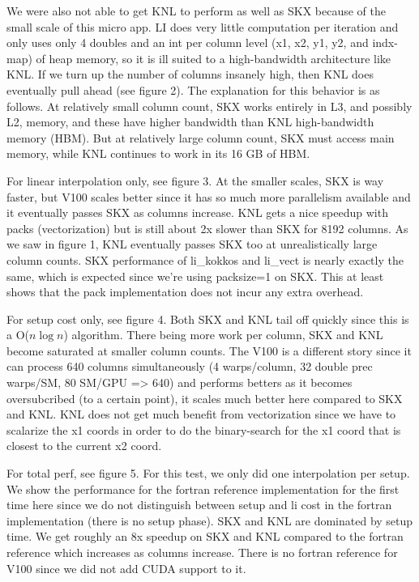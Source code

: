 \documentclass[10pt,twocolumn]{article}
\begin{document}
We were also not able to get KNL to perform as well as SKX because of the small scale
of this micro app. LI does very little computation per iteration and only uses only 4 doubles and an
int per column level (x1, x2, y1, y2, and indx-map) of heap memory, so it is ill suited to a high-bandwidth architecture
like KNL. If we turn up the number of columns insanely high, then KNL does eventually
pull ahead (see figure 2).
The explanation for this behavior is as follows.
At relatively small column count, SKX works entirely in L3, and possibly L2, memory,
and these have higher bandwidth than KNL high-bandwidth memory (HBM).
But at relatively large column count, SKX must access main memory,
while KNL continues to work in its 16 GB of HBM.

For linear interpolation only, see figure 3. At the smaller scales,
SKX is way faster, but V100 scales better since it has so much more
parallelism available and it eventually passes SKX as columns increase. KNL gets a nice speedup with packs
(vectorization) but is still about 2x slower than SKX for 8192
columns. As we saw in figure 1, KNL eventually passes SKX too at unrealistically large
column counts. SKX performance of li\_kokkos and li\_vect is nearly exactly the
same, which is expected since we're using packsize=1 on SKX. This at
least shows that the pack implementation does not incur any extra
overhead.

For setup cost only, see figure 4. Both SKX and KNL tail off quickly
since this is a O($n \log n$) algorithm. There being more work per column,
SKX and KNL become saturated at smaller column counts. The V100 is a different
story since it can process 640 columns simultaneously (4 warps/column, 32 double prec warps/SM, 80 SM/GPU => 640)
and performs betters as it becomes oversubcribed (to a certain point), it
scales much better here compared to SKX and KNL. KNL does not get much benefit from
vectorization since we have to scalarize the x1 coords in order to do
the binary-search for the x1 coord that is closest to the current x2
coord.

For total perf, see figure 5. For this test, we only did one
interpolation per setup. We show the performance for the fortran
reference implementation for the first time here since we do not
distinguish between setup and li cost in the fortran implementation
(there is no setup phase). SKX and KNL are dominated by setup time. We
get roughly an 8x speedup on SKX and KNL compared to the fortran
reference which increases as columns increase. There is no fortran
reference for V100 since we did not add CUDA support to it.
\end{document}

